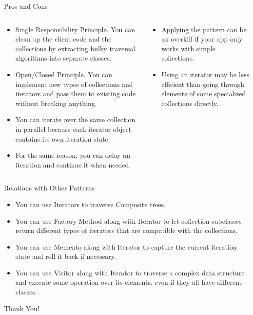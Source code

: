 \documentclass[13pt]{beamer}
\begin{document}
\begin{frame}{Pros and Cons}
	\begin{columns}[T]
		\begin{column}{.5\textwidth}
			\begin{itemize}
				\item Single Responsibility Principle. You can clean up the client code and the collections by extracting bulky traversal algorithms into separate classes.
				\item Open/Closed Principle. You can implement new types of collections and iterators and pass them to existing code without breaking anything.
				\item  You can iterate over the same collection in parallel because each iterator object contains its own iteration state.
				\item For the same reason, you can delay an iteration and continue it when needed.
			\end{itemize}
		\end{column}
	
		\begin{column}{.5\textwidth}
			\begin{itemize}
				\item Applying the pattern can be an overkill if your app only works with simple collections.
				\item Using an iterator may be less efficient than going through elements of some specialized collections directly.
			\end{itemize}
		\end{column}
	\end{columns}
\end{frame}

\begin{frame}{Relations with Other Patterns}
	\begin{itemize}
		\item You can use Iterators to traverse Composite trees.
		\item You can use Factory Method along with Iterator to let collection subclasses return different types of iterators that are compatible with the collections.
		\item You can use Memento along with Iterator to capture the current iteration state and roll it back if necessary.
		\item You can use Visitor along with Iterator to traverse a complex data structure and execute some operation over its elements, even if they all have different classes.
	\end{itemize}
\end{frame}

\begin{frame}
\begin{center}
{\fontsize{40}{50}\selectfont Thank You!}
\end{center}
\end{frame}
\end{document}
